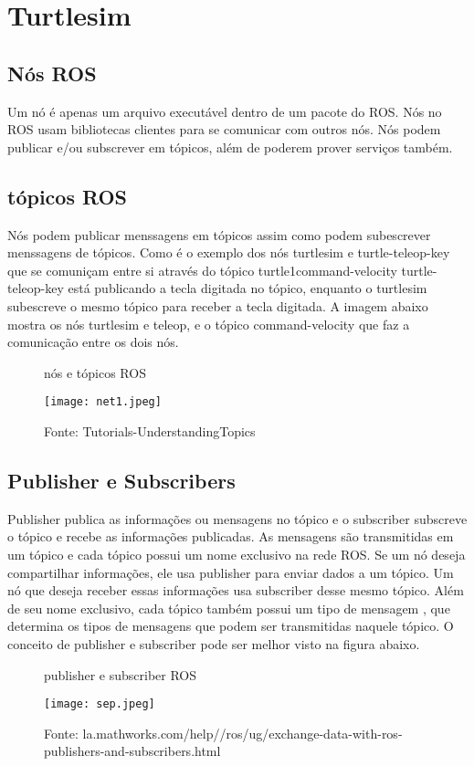 \section{Turtlesim}
\subsection{Nós ROS}
Um nó é apenas um arquivo executável dentro de um pacote do ROS. Nós no ROS usam bibliotecas clientes para se comunicar com outros nós.
Nós podem publicar e/ou subscrever em tópicos, além de poderem prover serviços também.
\subsection{tópicos ROS}
Nós podem publicar menssagens em tópicos assim como podem subescrever menssagens de tópicos.
Como é o exemplo dos nós turtlesim e turtle-teleop-key que se comuniçam entre si através do tópico turtle1command-velocity
turtle-teleop-key está publicando a tecla digitada no tópico, enquanto o turtlesim subescreve o mesmo tópico para receber a tecla digitada. 
A imagem abaixo mostra os nós turtlesim e teleop, e o tópico command-velocity que faz a comunicação entre os dois nós.

\begin{figure} [h!]	
   \centering
   \caption{nós e tópicos ROS}
   \texttt{[image: net1.jpeg]}
   \caption*{Fonte: Tutorials-UnderstandingTopics}
   \label{fig:nosetopicos}
\end{figure}	
\subsection{Publisher e Subscribers}
Publisher publica as informações ou mensagens no tópico e o subscriber subscreve o tópico e recebe as informações publicadas.
As mensagens são transmitidas em um tópico e cada tópico possui um nome exclusivo na rede ROS. Se um nó deseja compartilhar informações,
ele usa publisher para enviar dados a um tópico. Um nó que deseja receber essas informações usa subscriber desse mesmo tópico. 
Além de seu nome exclusivo, cada tópico também possui um tipo de mensagem , que determina os tipos de mensagens que podem ser transmitidas naquele tópico.
O conceito de publisher e subscriber pode ser melhor visto na figura abaixo.
\begin{figure} [h!]	
   \centering
   \caption{publisher e subscriber ROS}
   \texttt{[image: sep.jpeg]}
   \caption*{Fonte: la.mathworks.com/help//ros/ug/exchange-data-with-ros-publishers-and-subscribers.html}
   \label{fig:publisheresubscriber}
\end{figure}	
